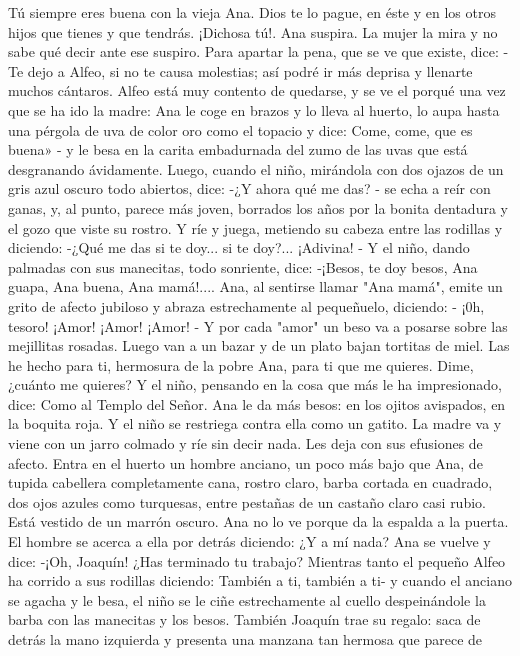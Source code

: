 \documentclass[12pt]{book} %
\begin{document}
Tú siempre eres buena con la vieja Ana. Dios te lo pague, en éste y en los otros hijos que tienes y que tendrás. ¡Dichosa tú!. 
Ana suspira. 
La mujer la mira y no sabe qué decir ante ese suspiro. Para apartar la pena, que se ve que existe, dice: - Te dejo a Alfeo, si no te causa molestias; así podré ir más deprisa y llenarte muchos cántaros. 
Alfeo está muy contento de quedarse, y se ve el porqué una vez que se ha ido la madre: Ana le coge en brazos y lo lleva 
al huerto, lo aupa hasta una pérgola de uva de color oro como el topacio y dice: 
Come, come, que es buena» - y le besa en la carita embadurnada del zumo de las uvas que está desgranando ávidamente. 
Luego, cuando el niño, mirándola con dos ojazos de un gris azul oscuro todo abiertos, dice: 
-¿Y ahora qué me das? - se echa a reír con ganas, y, al punto, parece más joven, borrados los años por la bonita 
dentadura y el gozo que viste su rostro. Y ríe y juega, metiendo su cabeza entre las rodillas y diciendo: 
-¿Qué me das si te doy... si te doy?... ¡Adivina! - Y el niño, dando palmadas con sus manecitas, todo sonriente, dice: 
-¡Besos, te doy besos, Ana guapa, Ana buena, Ana mamá!.... 
Ana, al sentirse llamar "Ana mamá", emite un grito de afecto jubiloso y abraza estrechamente al pequeñuelo, diciendo: - ¡0h, tesoro! ¡Amor! ¡Amor! ¡Amor! - Y por cada "amor" un beso va a posarse sobre las mejillitas rosadas. 
Luego van a un bazar y de un plato bajan tortitas de miel. 
Las he hecho para ti, hermosura de la pobre Ana, para ti que me quieres. Dime, ¿cuánto me quieres? Y el niño, 
pensando en la cosa que más le ha impresionado, dice: 
Como al Templo del Señor. 
Ana le da más besos: en los ojitos avispados, en la boquita roja. Y el niño se restriega contra ella como un gatito. 
La madre va y viene con un jarro colmado y ríe sin decir nada. Les deja con sus efusiones de afecto. 
Entra en el huerto un hombre anciano, un poco más bajo que Ana, de tupida cabellera completamente cana, rostro 
claro, barba cortada en cuadrado, dos ojos azules como turquesas, entre pestañas de un castaño claro casi rubio. Está vestido de un marrón oscuro. 
Ana no lo ve porque da la espalda a la puerta. El hombre se acerca a ella por detrás diciendo: 
¿Y a mí nada? 
Ana se vuelve y dice: 
-¡Oh, Joaquín! ¿Has terminado tu trabajo? 
 Mientras tanto el pequeño Alfeo ha corrido a sus rodillas diciendo: 
También a ti, también a ti- y cuando el anciano se agacha y le besa, el niño se le ciñe estrechamente al cuello 
despeinándole la barba con las manecitas y los besos. 
También Joaquín trae su regalo: saca de detrás la mano izquierda y presenta una manzana tan hermosa que parece de 
\end{document}
